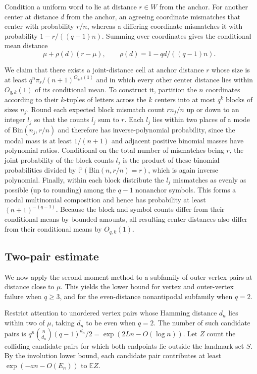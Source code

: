 Condition a uniform word to lie at distance $r\in W$ from the anchor. For another center at distance $d$ from the anchor, an agreeing coordinate mismatches that center with probability $r/n$, whereas a differing coordinate mismatches it with probability $1-r/((q-1)n)$. Summing over coordinates gives the conditional mean distance
\[
 \mu+\rho(d)(r-\mu),\qquad \rho(d)=1-qd/((q-1)n).
\]

We claim that there exists a joint-distance cell at anchor distance $r$ whose size is at least $q^n\pi_r/(n+1)^{O_{q,k}(1)}$ and in which every other center distance lies within $O_{q,k}(1)$ of its conditional mean. To construct it, partition the $n$ coordinates according to their $k$-tuples of letters across the $k$ centers into at most $q^k$ blocks of sizes $n_j$. Round each expected block mismatch count $rn_j/n$ up or down to an integer $l_j$ so that the counts $l_j$ sum to $r$. Each $l_j$ lies within two places of a mode of $\mathrm{Bin}(n_j,r/n)$ and therefore has inverse-polynomial probability, since the modal mass is at least $1/(n+1)$ and adjacent positive binomial masses have polynomial ratios. Conditional on the total number of mismatches being $r$, the joint probability of the block counts $l_j$ is the product of these binomial probabilities divided by $\mathbb P(\mathrm{Bin}(n,r/n)=r)$, which is again inverse polynomial. Finally, within each block distribute the $l_j$ mismatches as evenly as possible (up to rounding) among the $q-1$ nonanchor symbols. This forms a modal multinomial composition and hence has probability at least $(n+1)^{-(q-1)}$. Because the block and symbol counts differ from their conditional means by bounded amounts, all resulting center distances also differ from their conditional means by $O_{q,k}(1)$.

\subsection{Two-pair estimate}
We now apply the second moment method to a subfamily of outer vertex pairs at distance close to $\mu$. This yields the lower bound for vertex and outer-vertex failure when $q\ge3$, and for the even-distance nonantipodal subfamily when $q=2$.

Restrict attention to unordered vertex pairs whose Hamming distance $d_n$ lies within two of $\mu$, taking $d_n$ to be even when $q=2$. The number of such candidate pairs is $q^n\binom n{d_n}(q-1)^{d_n}/2=\exp(2Ln-O(\log n))$. Let $Z$ count the colliding candidate pairs for which both endpoints lie outside the landmark set $S$. By the involution lower bound, each candidate pair contributes at least $\exp(-an-O(E_n))$ to $\mathbb EZ$.

